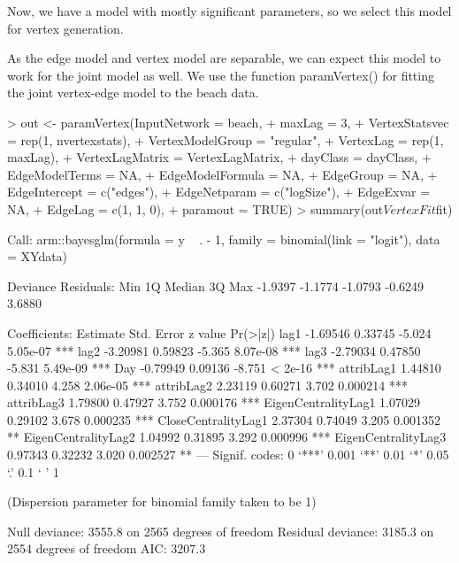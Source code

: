 \documentclass[12pt]{article}
\begin{document}
Now, we have a model with mostly significant parameters, so we select this model for vertex generation.

As the edge model and vertex model are separable, we can expect this model to work for the joint model as well. We use the function paramVertex() for fitting the joint vertex-edge model to the beach data.

\begin{Schunk}
\begin{Sinput}
> out <- paramVertex(InputNetwork = beach,
+                    maxLag = 3,
+                    VertexStatsvec = rep(1, nvertexstats),
+                    VertexModelGroup = "regular",
+                    VertexLag = rep(1, maxLag),
+                    VertexLagMatrix = VertexLagMatrix,
+                    dayClass = dayClass,
+                    EdgeModelTerms = NA,
+                    EdgeModelFormula = NA,
+                    EdgeGroup = NA,
+                    EdgeIntercept = c("edges"),
+                    EdgeNetparam = c("logSize"),
+                    EdgeExvar = NA,
+                    EdgeLag = c(1, 1, 0),
+                    paramout = TRUE)
> summary(out$VertexFit$fit)
\end{Sinput}
\begin{Soutput}
Call:
arm::bayesglm(formula = y ~ . - 1, family = binomial(link = "logit"), 
    data = XYdata)

Deviance Residuals: 
    Min       1Q   Median       3Q      Max  
-1.9397  -1.1774  -1.0793  -0.6249   3.6880  

Coefficients:
                    Estimate Std. Error z value Pr(>|z|)    
lag1                -1.69546    0.33745  -5.024 5.05e-07 ***
lag2                -3.20981    0.59823  -5.365 8.07e-08 ***
lag3                -2.79034    0.47850  -5.831 5.49e-09 ***
Day                 -0.79949    0.09136  -8.751  < 2e-16 ***
attribLag1           1.44810    0.34010   4.258 2.06e-05 ***
attribLag2           2.23119    0.60271   3.702 0.000214 ***
attribLag3           1.79800    0.47927   3.752 0.000176 ***
EigenCentralityLag1  1.07029    0.29102   3.678 0.000235 ***
CloseCentralityLag1  2.37304    0.74049   3.205 0.001352 ** 
EigenCentralityLag2  1.04992    0.31895   3.292 0.000996 ***
EigenCentralityLag3  0.97343    0.32232   3.020 0.002527 ** 
---
Signif. codes:  0 ‘***’ 0.001 ‘**’ 0.01 ‘*’ 0.05 ‘.’ 0.1 ‘ ’ 1

(Dispersion parameter for binomial family taken to be 1)

    Null deviance: 3555.8  on 2565  degrees of freedom
Residual deviance: 3185.3  on 2554  degrees of freedom
AIC: 3207.3


\end{Soutput}
\end{Schunk}
\end{document}
